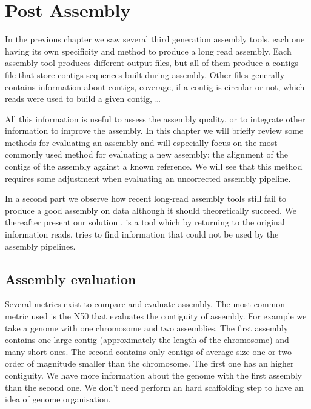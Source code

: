 \documentclass[main.tex]{subfiles}
\begin{document}
\chapter{Post Assembly} \label{chapter:postassembly}

In the previous chapter we saw several third generation assembly tools, each one having its own specificity and method to produce a long read assembly. Each assembly tool produces different output files, but all of them produce a contigs file that store contigs sequences built during assembly. Other files generally contains information about contigs, coverage, if a contig is circular or not, which reads were used to build a given contig, …

All this information is useful to assess the assembly quality, or to integrate other information to improve the assembly. In this chapter we will briefly review some methods for evaluating an assembly and will especially focus on the most commonly used method for evaluating a new assembly: the alignment of the contigs of the assembly against a known reference.%
We will see that this method requires some adjustment when evaluating an uncorrected assembly pipeline.

In a second part we  observe how recent long-read assembly tools still fail to produce a good assembly on data although it should  theoretically succeed. We thereafter present our solution \knot. \knot is a tool which by returning to the original information reads, tries to find information that could not be used by the assembly pipelines.%

\section{Assembly evaluation} \label{section:post:eval}

Several metrics exist to compare and evaluate assembly. The most common metric used is the N50 that evaluates the contiguity of assembly. For example we take a genome with one chromosome and two assemblies. The first assembly contains one large contig (approximately the length of the chromosome) and many short ones. The second contains only contigs of average size one or two order of magnitude smaller than the chromosome. The first one has an higher contiguity. We have more information about the genome with the first assembly than the second one. We don't need perform an hard scaffolding step to have an idea of genome organisation.
\end{document}
